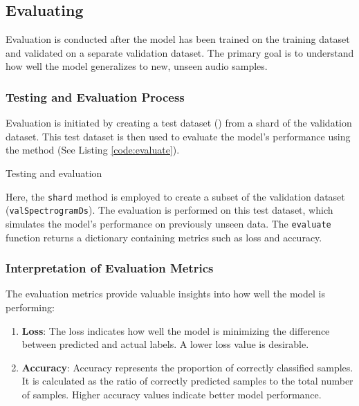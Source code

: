 \subsection{Evaluating}

Evaluation is conducted after the model has been trained on the training dataset and validated on a separate validation dataset. The primary goal is to understand how well the model generalizes to new, unseen audio samples.

\subsubsection{Testing and Evaluation Process}

Evaluation is initiated by creating a test dataset () from a shard of the validation dataset. This test dataset is then used to evaluate the model's performance using the  method (See Listing \ref{code:evaluate}).

\begin{code}[h!]
	    
	
	\caption{Testing and evaluation}
	\label{code:evaluate}
\end{code}


Here, the \texttt{shard} method is employed to create a subset of the validation dataset (\texttt{valSpectrogramDs}). The evaluation is performed on this test dataset, which simulates the model's performance on previously unseen data. The \texttt{evaluate} function returns a dictionary containing metrics such as loss and accuracy.

\subsubsection{Interpretation of Evaluation Metrics}

The evaluation metrics provide valuable insights into how well the model is performing:

\begin{enumerate}
	\item \textbf{Loss}: The loss indicates how well the model is minimizing the difference between predicted and actual labels. A lower loss value is desirable.
	\item \textbf{Accuracy}: Accuracy represents the proportion of correctly classified samples. It is calculated as the ratio of correctly predicted samples to the total number of samples. Higher accuracy values indicate better model performance.
\end{enumerate}

